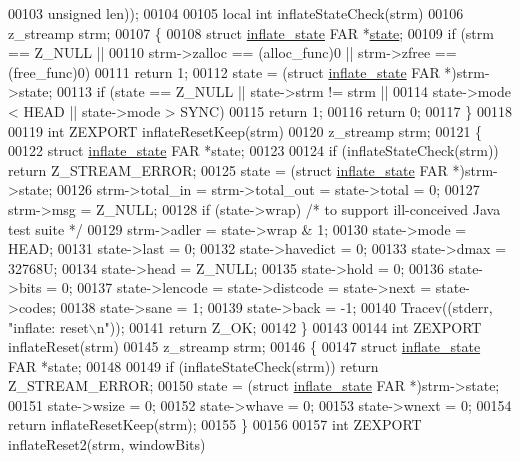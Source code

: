 \begin{DoxyCode}
00103                               \textcolor{keywordtype}{unsigned} len));
00104 
00105 local \textcolor{keywordtype}{int} inflateStateCheck(strm)
00106 z\_streamp strm;
00107 \{
00108     \textcolor{keyword}{struct }\hyperlink{structinflate__state}{inflate\_state} FAR *\hyperlink{structstate}{state};
00109     \textcolor{keywordflow}{if} (strm == Z\_NULL ||
00110         strm->zalloc == (alloc\_func)0 || strm->zfree == (free\_func)0)
00111         \textcolor{keywordflow}{return} 1;
00112     state = (\textcolor{keyword}{struct }\hyperlink{structinflate__state}{inflate\_state} FAR *)strm->state;
00113     if (state == Z\_NULL || state->strm != strm ||
00114         state->mode < HEAD || state->mode > SYNC)
00115         \textcolor{keywordflow}{return} 1;
00116     \textcolor{keywordflow}{return} 0;
00117 \}
00118 
00119 \textcolor{keywordtype}{int} ZEXPORT inflateResetKeep(strm)
00120 z\_streamp strm;
00121 \{
00122     \textcolor{keyword}{struct }\hyperlink{structinflate__state}{inflate\_state} FAR *state;
00123 
00124     \textcolor{keywordflow}{if} (inflateStateCheck(strm)) \textcolor{keywordflow}{return} Z\_STREAM\_ERROR;
00125     state = (\textcolor{keyword}{struct }\hyperlink{structinflate__state}{inflate\_state} FAR *)strm->state;
00126     strm->total\_in = strm->total\_out = state->total = 0;
00127     strm->msg = Z\_NULL;
00128     if (state->wrap)        \textcolor{comment}{/* to support ill-conceived Java test suite */}
00129         strm->adler = state->wrap & 1;
00130     state->mode = HEAD;
00131     state->last = 0;
00132     state->havedict = 0;
00133     state->dmax = 32768U;
00134     state->head = Z\_NULL;
00135     state->hold = 0;
00136     state->bits = 0;
00137     state->lencode = state->distcode = state->next = state->codes;
00138     state->sane = 1;
00139     state->back = -1;
00140     Tracev((stderr, \textcolor{stringliteral}{"inflate: reset\(\backslash\)n"}));
00141     \textcolor{keywordflow}{return} Z\_OK;
00142 \}
00143 
00144 \textcolor{keywordtype}{int} ZEXPORT inflateReset(strm)
00145 z\_streamp strm;
00146 \{
00147     \textcolor{keyword}{struct }\hyperlink{structinflate__state}{inflate\_state} FAR *state;
00148 
00149     \textcolor{keywordflow}{if} (inflateStateCheck(strm)) \textcolor{keywordflow}{return} Z\_STREAM\_ERROR;
00150     state = (\textcolor{keyword}{struct }\hyperlink{structinflate__state}{inflate\_state} FAR *)strm->state;
00151     state->wsize = 0;
00152     state->whave = 0;
00153     state->wnext = 0;
00154     \textcolor{keywordflow}{return} inflateResetKeep(strm);
00155 \}
00156 
00157 \textcolor{keywordtype}{int} ZEXPORT inflateReset2(strm, windowBits)

\end{DoxyCode}
